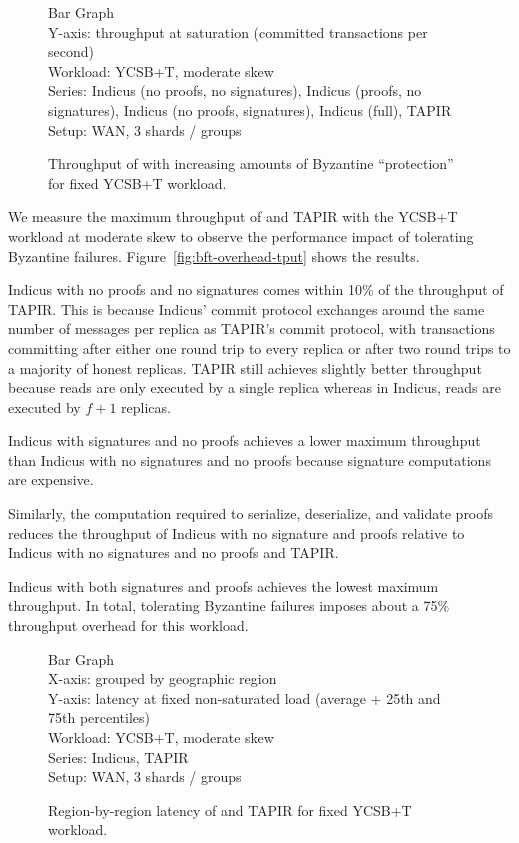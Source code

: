 \begin{figure}
  Bar Graph\\
  Y-axis: throughput at saturation (committed transactions per second)\\
  Workload: YCSB+T, moderate skew\\
  Series: Indicus (no proofs, no signatures), Indicus (proofs, no signatures),
    Indicus (no proofs, signatures), Indicus (full), TAPIR\\
  Setup: WAN, 3 shards / groups\\
  \caption{Throughput of \sys{} with increasing amounts of Byzantine
  ``protection'' for fixed YCSB+T workload.}
  \label{fig:bft-overhead-tpu}
\end{figure}

We measure the maximum throughput of \sys{} and TAPIR with the YCSB+T workload at
moderate skew to observe the performance impact of tolerating Byzantine failures.
Figure~\ref{fig:bft-overhead-tput} shows the results.

Indicus with no proofs and no signatures comes within 10\% of the throughput of
TAPIR. This is because Indicus' commit protocol exchanges around the same
number of messages per replica as TAPIR's commit protocol, with
transactions committing after either one round trip to every replica or after
two round trips to a majority of honest replicas.  TAPIR still achieves slightly
better throughput because reads are only executed by a single replica whereas in
Indicus, reads are executed by $f+1$ replicas.

Indicus with signatures and no proofs achieves a lower maximum throughput than
Indicus with no signatures and no proofs because signature computations are
expensive.

Similarly, the computation required to serialize, deserialize, and validate
proofs reduces the throughput of Indicus with no signature and proofs relative
to Indicus with no signatures and no proofs and TAPIR.

Indicus with both signatures and proofs achieves the lowest maximum throughput.
In total, tolerating Byzantine failures imposes about a 75\% throughput overhead
for this workload.

\begin{figure}
  Bar Graph\\
  X-axis: grouped by geographic region\\
  Y-axis: latency at fixed non-saturated load (average + 25th and 75th percentiles)\\
  Workload: YCSB+T, moderate skew\\
  Series: Indicus, TAPIR\\
  Setup: WAN, 3 shards / groups\\
  \caption{Region-by-region latency of \sys{} and TAPIR for fixed YCSB+T workload.}
\end{figure}

